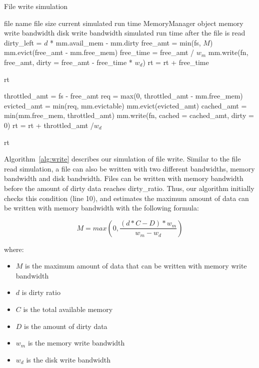 \documentclass[conference]{IEEEtran}
\newcommand{\Desc}[2]{\State \makebox[2em][l]{#1}#2}
\begin{document}
			\begin{algorithm}\caption{File write simulation}\label{alg:write}
				\small
				\begin{algorithmic}[1]
					\Input
        				\Desc{fn}{file name}
        				\Desc{fs}{file size}
						\Desc{rt}{current simulated run time}
						\Desc{mm}{MemoryManager object}
						\Desc{$w_m$}{memory write bandwidth}
						\Desc{$w_d$}{disk write bandwidth}
   					\EndInput
   					\Output
						\Desc{rt}{simulated run time after the file is read}
   					\EndOutput
					\State dirty\_left = $d$ * mm.avail\_mem - mm.dirty
   						\State free\_amt = min(fs, $M$) 
    					\State mm.evict(free\_amt - mm.free\_mem)
    					\State free\_time = free\_amt / $w_m$
    					\State mm.write(fn, free\_amt, dirty = free\_amt - free\_time * $w_d$)
   						\State rt = rt + free\_time
    				\EndIf
					
						\Return rt
					\EndIf

					\State throttled\_amt = fs - free\_amt 
					\State req = max(0, throttled\_amt  - mm.free\_mem)
					\State evicted\_amt = min(req, mm.evictable)
					\State mm.evict(evicted\_amt)
					\State cached\_amt = min(mm.free\_mem, throttled\_amt)
					\State mm.write(fn, cached = cached\_amt, dirty = 0)
					\State rt = rt + throttled\_amt /$w_d$

					\Return rt
					
				\end{algorithmic}
			\end{algorithm}

			Algorithm~\ref{alg:write} describes our simulation of file write. 
			Similar to the file read simulation, a file can also be written with 
			two different bandwidths, memory bandwidth and disk bandwidth. 
			Files can be written with memory bandwidth before the amount 
			of dirty data reaches dirty\_ratio. Thus, our algorithm initially checks 
			this condition (line 10), and estimates the maximum amount 
			of data can be written with memory bandwidth with the following 
			formula:
			
			\begin{equation}
				M = max(0, \frac{(d*C - D)*w_m}{w_m - w_d})\label{equa:freeamt}
			\end{equation}			 			

			where:
			\begin{itemize}
				\item $M$ is the maximum amount of data that can be written with memory 
				write bandwidth
				\item $d$ is dirty ratio
				\item $C$ is the total available memory
				\item $D$ is the amount of dirty data
				\item $w_m$ is the memory write bandwidth 
				\item $w_d$ is the disk write bandwidth			
			\end{itemize}
			
\end{document}
